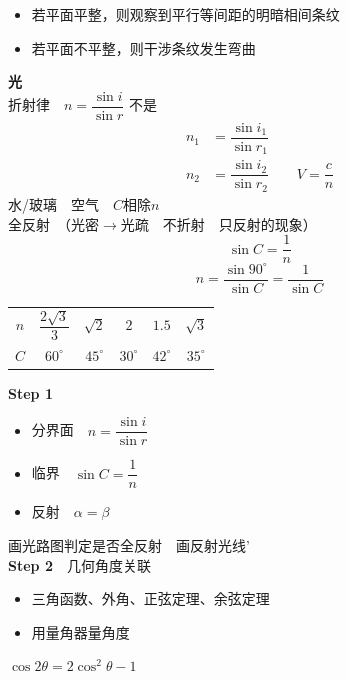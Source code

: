 \begin{itemize}
\item 若平面平整，则观察到平行等间距的明暗相间条纹 %
\item 若平面不平整，则干涉条纹发生弯曲
\end{itemize}
\textbf{光}\\[0.8ex]
折射律　$n=\dfrac{\sin i}{\sin r}$
不是
\begin{align*}
n_1&=\dfrac{\sin i_1}{\sin r_1}\\
n_2&=\dfrac{\sin i_2}{\sin r_2}\qquad V=\dfrac{c}{n}
\end{align*}
水/玻璃　空气　$C$相除$n$\\
全反射　（光密$\to$光疏　不折射　只反射的现象）
\[
\sin C=\dfrac{1}{n}
\]
\[
n=\dfrac{\sin 90^\circ}{\sin C}=\dfrac{1}{\sin C}
\]
\begin{center}
\begin{tabular}{cccccc}
$n$ & $\dfrac{2\sqrt{3}}{3}$ & $\sqrt{2}$ & $2$ & $1.5$ & $\sqrt{3}$\\[1.2ex]
$C$ & $60^\circ$ & $45^\circ$ & $30^\circ$ & $42^\circ$ & $35^\circ$
\end{tabular}
\end{center}
\textbf{Step 1}
\begin{itemize}
\item 分界面　$n=\dfrac{\sin i}{\sin r}$
\item 临界　$\sin C=\dfrac{1}{n}$
\item 反射　$\alpha=\beta$
\end{itemize}
画光路图判定是否全反射　画反射光线'\\[0.8ex]
\textbf{Step 2}　几何角度关联
\begin{itemize}
\item 三角函数、外角、正弦定理、余弦定理　
\item 用量角器量角度
\end{itemize}
$\cos2\theta=2\cos^2\theta-1$
